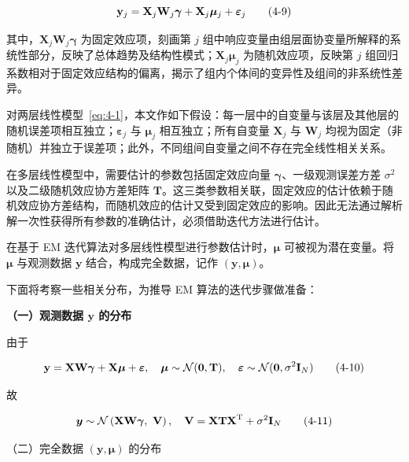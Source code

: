 \documentclass[12pt,a4paper]{ctexart}
\makeatletter
\numberwithin{figure}{section}
\numberwithin{table}{section}
\let\ltx@orig@tag\tag
\renewcommand{\tag}[1]{\refstepcounter{equation}\ltx@orig@tag{#1}}%
\makeatother
\begin{document}
\begin{equation}
\mathbf{y}_j = \mathbf{X}_j \mathbf{W}_j \boldsymbol{\gamma} + \mathbf{X}_j \boldsymbol{\mu}_j + \boldsymbol{\varepsilon}_j
\tag{4-9}
\end{equation}

其中，$\mathbf{X}_j \mathbf{W}_j \boldsymbol{\gamma}$ 为固定效应项，刻画第 $j$ 组中响应变量由组层面协变量所解释的系统性部分，反映了总体趋势及结构性模式；$\mathbf{X}_j \boldsymbol{\mu}_j$ 为随机效应项，反映第 $j$ 组回归系数相对于固定效应结构的偏离，揭示了组内个体间的变异性及组间的非系统性差异。

对两层线性模型~\eqref{eq:4-1}，本文作如下假设：每一层中的自变量与该层及其他层的随机误差项相互独立；$\boldsymbol{\varepsilon}_j$ 与 $\boldsymbol{\mu}_j$ 相互独立；所有自变量 $\mathbf{X}_j$ 与 $\mathbf{W}_j$ 均视为固定（非随机）并独立于误差项；此外，不同组间自变量之间不存在完全线性相关关系。

在多层线性模型中，需要估计的参数包括固定效应向量 $\boldsymbol{\gamma}$、一级观测误差方差 $\sigma^2$ 以及二级随机效应协方差矩阵 $\mathbf{T}$。这三类参数相关联，固定效应的估计依赖于随机效应协方差结构，而随机效应的估计又受到固定效应的影响。因此无法通过解析解一次性获得所有参数的准确估计，必须借助迭代方法进行估计。

在基于 EM 迭代算法对多层线性模型进行参数估计时，$\boldsymbol{\mu}$ 可被视为潜在变量。将 $\boldsymbol{\mu}$ 与观测数据 $\mathbf{y}$ 结合，构成完全数据，记作 $(\mathbf{y}, \boldsymbol{\mu})$。

下面将考察一些相关分布，为推导 EM 算法的迭代步骤做准备：

\textbf{（一）观测数据 $\mathbf{y}$ 的分布}

由于

\begin{equation}
\mathbf{y} = \mathbf{X}\mathbf{W}\boldsymbol{\gamma} + \mathbf{X}\boldsymbol{\mu} + \boldsymbol{\varepsilon}, \quad \boldsymbol{\mu} \sim \mathcal{N}(\mathbf{0}, \mathbf{T}), \quad \boldsymbol{\varepsilon} \sim \mathcal{N}(\mathbf{0}, \sigma^2 \mathbf{I}_N)
\tag{4-10}
\end{equation}

故

\begin{equation}
\boldsymbol{y}\sim\mathcal{N}\left(\mathbf{XW}\boldsymbol{\gamma},\ \mathbf{V}\right),\quad \mathbf{V}=\mathbf{XTX}^{\mathrm{T}}+\sigma^{2}\mathbf{I}_{N} \tag{4-11}
\end{equation}

（二）完全数据 $(\boldsymbol{y},\boldsymbol{\mu})$ 的分布
\end{document}
